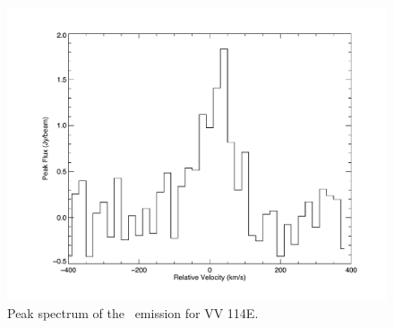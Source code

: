 \begin{figure}[h] %
\centering
\includegraphics[scale=0.5,angle=-90]{Chapter-2/Figures/fig2.pdf} 
\caption[]{Peak spectrum of the \cosix\ emission for VV 114E.}
\label{Inte}
\end{figure}

